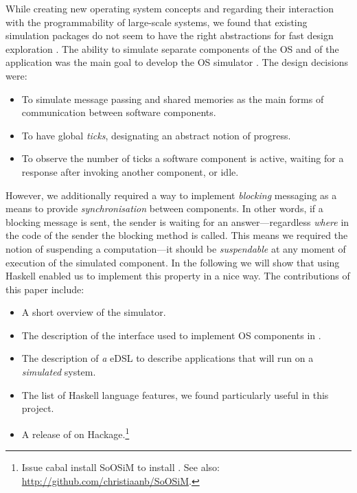 While creating new operating system concepts and regarding their interaction with the programmability of large-scale systems, we found that existing simulation packages do not seem to have the right abstractions for fast design exploration \cite{cotson,omnet}.
The ability to simulate separate components of the OS and of the application was the main goal to develop the OS simulator \soosim \cite{Baaij:2012}.
The design decisions were:
\begin{itemize}
\item To simulate message passing and shared memories as the main forms of communication between software components.
\item To have global \emph{ticks}, designating an abstract notion of progress.
\item To observe the number of ticks a software component is active, waiting for a response after invoking another component, or idle.
\end{itemize}
However, we additionally required a way to implement \emph{blocking} messaging as a means to provide \emph{synchronisation} between components.
In other words, if a blocking message is sent, the sender is waiting for an answer---regardless \emph{where} in the code of the sender the blocking  method is called.
This means we required the notion of suspending a computation---it should be \emph{suspendable} at any moment of execution of the simulated component.
In the following we will show that using Haskell\nolinebreak[3] \cite{haskell-report} enabled us to implement this property in a nice way.
The contributions of this paper include:
\begin{itemize}
\item A short overview of the \soosim simulator.
\item The description of the interface used to implement OS components in \soosim.
\item The description of \emph{a} eDSL to describe applications that will run on a \soosim \emph{simulated} system.
\item The list of Haskell language features, we found particularly useful in this project.
\item A release of \soosim on Hackage.\footnote{Issue \textsf{cabal install SoOSiM} to install \soosim. See also: \url{http://github.com/christiaanb/SoOSiM}.}
\end{itemize}
